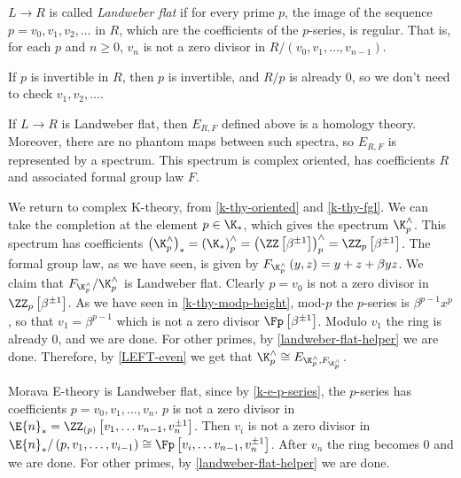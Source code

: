 \begin{definition}
	$L \to R$ is called \emph{Landweber flat} if for every prime $p$, the image of the sequence $p = v_0, v_1, v_2, \dotsc$ in $R$, which are the coefficients of the $p$-series, is regular.
	That is, for each $p$ and $n \geq 0$, $v_n$ is not a zero divisor in $R/\left(v_0, v_1, \dotsc, v_{n-1}\right)$.
\end{definition}

\begin{remark}\label{landweber-flat-helper}
	If $p$ is invertible in $R$, then $p$ is invertible, and $R/p$ is already $0$, so we don't need to check $v_1, v_2, \dotsc$.
\end{remark}

\begin{theorem}\label{LEFT}
	If $L \to R$ is Landweber flat, then $E_{R,F}$ defined above is a homology theory.
	Moreover, there are no phantom maps between such spectra, so $E_{R,F}$ is represented by a spectrum.
	This spectrum is complex oriented, has coefficients $R$ and associated formal group law $F$.
\end{theorem}

\begin{example}\label{k-thy-comp-left}
	We return to complex K-theory, from \ref{k-thy-oriented} and \ref{k-thy-fgl}.
	We can take the completion at the element $p \in \K_*$, which gives the spectrum $\K_p^\wedge$.
	This spectrum has coefficients
	$
	\left(\K_p^\wedge\right)_*
	= \left(\K_*\right)_p^\wedge
	= \left(\ZZ\left[\beta^{\pm 1}\right]\right)_p^\wedge
	= \ZZ_p\left[\beta^{\pm 1}\right]
	$.
	The formal group law, as we have seen, is given by $F_{\K_p^\wedge}\left(y,z\right) = y + z + \beta y z$.
	We claim that $F_{\K_p^\wedge}/\K_p^\wedge$ is Landweber flat.
	Clearly $p = v_0$ is not a zero divisor in $\ZZ_p\left[\beta^{\pm 1}\right]$.
	As we have seen in \ref{k-thy-modp-height}, mod-$p$ the $p$-series is $\beta^{p-1} x^p$, so that $v_1 = \beta^{p-1}$ which is not a zero divisor $\Fp\left[\beta^{\pm 1}\right]$.
	Modulo $v_1$ the ring is already $0$, and we are done.
	For other primes, by \ref{landweber-flat-helper} we are done.
	Therefore, by \ref{LEFT-even} we get that $\K_p^\wedge \cong E_{\K_p^\wedge, F_{\K_p^\wedge}}$.
\end{example}

\begin{example}
	Morava E-theory is Landweber flat, since by \ref{k-e-p-series}, the $p$-series has coefficients $p = v_0, v_1, \dotsc, v_n$.
	$p$ is not a zero divisor in $\E{n}_* = \ZZ_{\left(p\right)}\left[v_1, \dotsc v_{n-1}, v_n^{\pm 1}\right]$.
	Then $v_i$ is not a zero divisor in $\E{n}_*/\left(p, v_1, \dotsc, v_{i-1}\right) \cong \Fp\left[v_i, \dotsc v_{n-1}, v_n^{\pm 1}\right]$.
	After $v_n$ the ring becomes $0$ and we are done.
	For other primes, by \ref{landweber-flat-helper} we are done.
\end{example}

